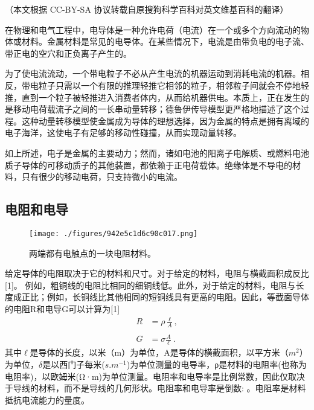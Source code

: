 
（本文根据 CC-BY-SA 协议转载自原搜狗科学百科对英文维基百科的翻译）

在物理和电气工程中，电导体是一种允许电荷（电流）在一个或多个方向流动的物体或材料。金属材料是常见的电导体。在某些情况下，电流是由带负电的电子流、带正电的空穴和正负离子产生的。

为了使电流流动，一个带电粒子不必从产生电流的机器运动到消耗电流的机器。相反，带电粒子只需以一个有限的推理轻推它相邻的粒子，相邻粒子间就会不停地轻推，直到一个粒子被轻推进入消费者体内，从而给机器供电。本质上，正在发生的是移动电荷载流子之间的一长串动量转移；德鲁伊传导模型更严格地描述了这个过程。这种动量转移模型使金属成为导体的理想选择，因为金属的特点是拥有离域的电子海洋，这使电子有足够的移动性碰撞，从而实现动量转移。

如上所述，电子是金属的主要动力；然而，诸如电池的阳离子电解质、或燃料电池质子导体的可移动质子的其他装置，都依赖于正电荷载体。绝缘体是不导电的材料，只有很少的移动电荷，只支持微小的电流。

\subsection{ 电阻和电导}
\begin{figure}[ht]
\centering
\texttt{[image: ./figures/942e5c1d6c90c017.png]}
\caption{两端都有电触点的一块电阻材料。} \label{fig_DDT_1}
\end{figure}
给定导体的电阻取决于它的材料和尺寸。对于给定的材料，电阻与横截面积成反比[1]。 例如，粗铜线的电阻比相同的细铜线低。此外，对于给定的材料，电阻与长度成正比；例如，长铜线比其他相同的短铜线具有更高的电阻。因此，等截面导体的电阻R和电导G可以计算为[1]
\begin{equation}
\begin{aligned}
R &= \rho \frac{\ell}{A}, \\\\
G &= \sigma \frac{A}{\ell}~.
\end{aligned}
\end{equation}
其中$\ell$是导体的长度，以米（m）为单位，A是导体的横截面积，以平方米（$m^2$）为单位，$\delta$是以西门子每米($s.m^{-1}$)为单位测量的电导率，ρ是材料的电阻率(也称为电阻率)，以欧姆米(Ω·m)为单位测量。电阻率和电导率是比例常数，因此仅取决于导线的材料，而不是导线的几何形状。电阻率和电导率是倒数:  。电阻率是材料抵抗电流能力的量度。
